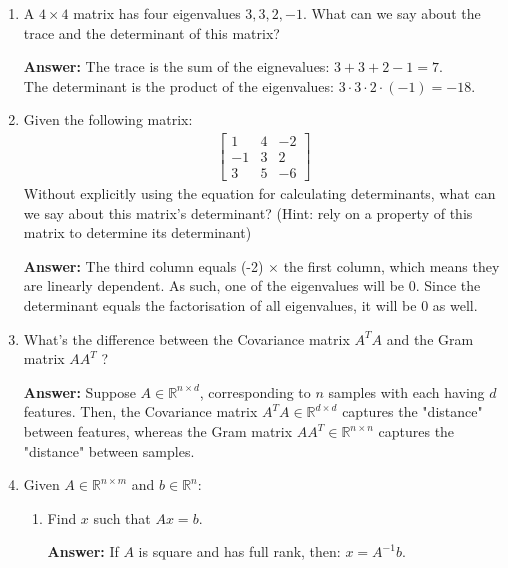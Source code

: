 \documentclass{article}
\newenvironment{QandA}{\begin{enumerate}[label=\arabic*.]}{\end{enumerate}}
\newenvironment{InnerQandA}{\begin{enumerate}[label=\roman*.]}{\end{enumerate}}
\newenvironment{answer}{\par\normalfont \textbf{Answer:}}{}
\newcommand{\R}{\mathbb{R}}
\begin{document}
\begin{QandA}
    \item A $4 \times 4$ matrix has four eigenvalues $3,3,2,-1$. What can we say about the trace and the determinant of this matrix?
    \begin{answer}
        The trace is the sum of the eignevalues: $3+3+2-1 = 7$. \\
        The determinant is the product of the eigenvalues: $3 \cdot 3 \cdot 2 \cdot (-1) = -18$.
    \end{answer}
    
    \item Given the following matrix:
    \begin{align*}
        \begin{bmatrix}
        1 & 4 & -2 \\
        -1 & 3 & 2 \\
        3 & 5 & -6
    \end{bmatrix}
    \end{align*}
    Without explicitly using the equation for calculating determinants, what can we say about this matrix’s determinant? (Hint: rely on a property of this matrix to determine its determinant)
    \begin{answer}
        The third column equals (-2) $\times$ the first column, which means they are linearly dependent. As such, one of the eigenvalues will be 0. Since the determinant equals the factorisation of all eigenvalues, it will be 0 as well. 
    \end{answer}
    
    \item What’s the difference between the Covariance matrix  $A^TA$ and the Gram matrix $AA^T$ ?
    \begin{answer}
        Suppose $A \in \R^{n \times d}$, corresponding to $n$ samples with each having $d$ features. Then, the Covariance matrix $A^TA \in \R^{d \times d}$ captures the "distance" between features, whereas the Gram matrix $AA^T \in \R^{n \times n}$ captures the "distance" between samples.
    \end{answer}
    
    \item Given $A \in \R^{n \times m}$ and $b \in \R^n$:
    \begin{InnerQandA}
        \item Find $x$ such that $Ax = b$.
        \begin{answer}
            If $A$ is square and has full rank, then: $x = A^{-1}b$.
        \end{answer}
        

\end{InnerQandA}
\end{QandA}
\end{document}
